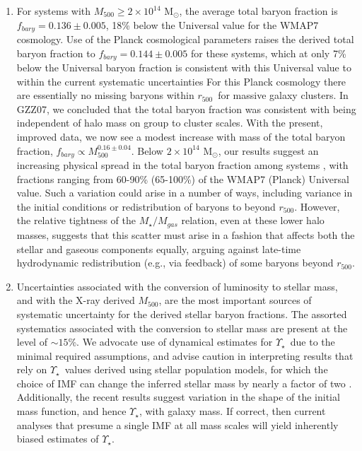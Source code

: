 \documentclass[preprint]{emulateapj}
\newcommand{\msun}{M$_\odot$}
\newcommand\rfive{$r_{500}$}
\newcommand\ptwo{GZZ07}
\newcommand\mfive{${M}_{500}$}
\newcommand{\mlrat}{$\Upsilon_\star$}
\begin{document}
\begin{enumerate}
\item{ For systems with $M_{500}\ge2\times10^{14}$ \msun, the average
    total baryon fraction is $f_{bary}=0.136\pm0.005$, 18\% below the
    Universal value  for the WMAP7 cosmology. Use of the
    Planck cosmological parameters raises the derived total baryon fraction
    to $f_{bary}=0.144\pm0.005$ for these systems, which at only 7\% below
    the Universal baryon fraction is consistent with this Universal value to within the
    current systematic uncertainties 
    For this Planck cosmology
    there are essentially no missing baryons within \rfive\ for massive galaxy clusters.
  In \ptwo, we concluded that the total baryon fraction was consistent
  with being independent of halo mass on group to cluster scales.
  With the present, improved data, we now see a modest increase with
  mass of the total baryon fraction, $f_{bary}\propto
  M_{500}^{0.16\pm0.04}$.  Below $2\times10^{14}$ \msun, our results
  suggest an increasing physical spread in the total baryon fraction
  among systems \citep[see also][]{sanderson2013}, with fractions
  ranging from 60-90\% (65-100\%) of the WMAP7 (Planck) Universal value.
  Such a variation could arise in a number of ways,
  including variance in the initial conditions or redistribution of
  baryons to beyond \rfive.  However, the relative tightness of the
  $M_{\star}/M_{gas}$ relation, even at these lower halo masses,
  suggests that this scatter must arise in a fashion that affects both
  the stellar and gaseous components equally, arguing against
  late-time hydrodynamic redistribution (e.g., via feedback) of some
  baryons beyond \rfive.}

\item{
Uncertainties associated with the conversion of luminosity
to stellar mass, and with the X-ray derived \mfive, are the most important
sources of systematic uncertainty for the derived stellar baryon fractions.
The assorted systematics associated with the conversion to stellar mass
are present at the level of $\sim15$\%.
     We advocate use of dynamical
    estimates for \mlrat\ due to the minimal required assumptions, and
    advise caution in interpreting results that rely on \mlrat\ values
    derived using stellar population models, for which the choice of
    IMF can change the inferred stellar mass by nearly a factor of two
    \citep[e.g.,][]{leauthaud2012}. Additionally, the recent
    \citet{cappellari2011,cappellari2013} results suggest variation in the shape of
    the initial mass function, and hence \mlrat, with galaxy mass. If
    correct, then current analyses that presume a single IMF at all
    mass scales will yield inherently biased estimates of \mlrat. 

}
\end{enumerate}
\end{document}
